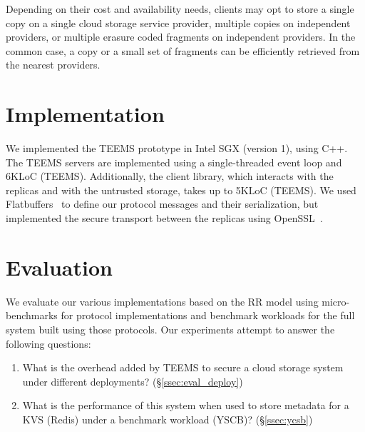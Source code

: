 Depending on their cost and availability needs, clients may opt to
store a single copy on a single cloud storage service provider,
multiple copies on independent providers, or multiple erasure coded
fragments on independent providers. In the common case, a copy or a
small set of fragments can be efficiently retrieved from the nearest
providers.


\section{Implementation}\label{sec:teems_impl}

We implemented the \ac{TEEMS} prototype in Intel SGX (version 1),
using C++. The \ac{TEEMS} servers are implemented using a
single-threaded event loop and 6KLoC (\ac{TEEMS}). Additionally,
the client library, which interacts with the replicas and with
the untrusted storage, takes up to 5KLoC (\ac{TEEMS}). We used
Flatbuffers~\cite{flatbuffers} to define our protocol messages
and their serialization, but implemented the secure transport
between the replicas using OpenSSL~\cite{openssl}.


\section{Evaluation}\label{sec:teems_eval}


We evaluate our various implementations based on the \ac{RR}
model using micro-benchmarks for protocol implementations and
benchmark workloads for the full system built using those
protocols. Our experiments attempt to answer the following
questions:

\begin{enumerate}
    \item What is the overhead added by \ac{TEEMS} to secure a cloud storage system under different
      deployments?  (\S\ref{ssec:eval_deploy})
    \item What is the performance of this system  when used to store
      metadata for a \ac{KVS} (Redis) under a benchmark
      workload (YSCB)?
      (\S\ref{ssec:ycsb})
\end{enumerate}

